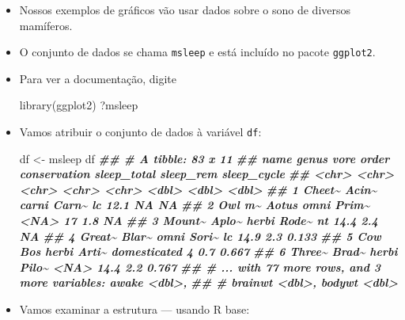 \documentclass[
  11pt]{report}
\newenvironment{Shaded}{\begin{snugshade}}{\end{snugshade}}
\newcommand{\DocumentationTok}[1]{\textcolor[rgb]{0.56,0.35,0.01}{\textbf{\textit{#1}}}}
\newcommand{\FunctionTok}[1]{\textcolor[rgb]{0.00,0.00,0.00}{#1}}
\newcommand{\NormalTok}[1]{#1}
\newcommand{\OtherTok}[1]{\textcolor[rgb]{0.56,0.35,0.01}{#1}}
\begin{document}
\begin{itemize}
\item
  Nossos exemplos de gráficos vão usar dados sobre o sono de diversos mamíferos.
\item
  O conjunto de dados se chama \texttt{msleep} e está incluído no pacote \texttt{ggplot2}.
\item
  Para ver a documentação, digite

\begin{Shaded}
\begin{Highlighting}[]
\FunctionTok{library}\NormalTok{(ggplot2)}
\NormalTok{?msleep}
\end{Highlighting}
\end{Shaded}
\item
  Vamos atribuir o conjunto de dados à variável \texttt{df}:

\begin{Shaded}
\begin{Highlighting}[]
\NormalTok{df }\OtherTok{\textless{}{-}}\NormalTok{ msleep}
\NormalTok{df}
\DocumentationTok{\#\# \# A tibble: 83 x 11}
\DocumentationTok{\#\#   name   genus vore  order conservation sleep\_total sleep\_rem sleep\_cycle}
\DocumentationTok{\#\#   \textless{}chr\textgreater{}  \textless{}chr\textgreater{} \textless{}chr\textgreater{} \textless{}chr\textgreater{} \textless{}chr\textgreater{}              \textless{}dbl\textgreater{}     \textless{}dbl\textgreater{}       \textless{}dbl\textgreater{}}
\DocumentationTok{\#\# 1 Cheet\textasciitilde{} Acin\textasciitilde{} carni Carn\textasciitilde{} lc                  12.1      NA        NA    }
\DocumentationTok{\#\# 2 Owl m\textasciitilde{} Aotus omni  Prim\textasciitilde{} \textless{}NA\textgreater{}                17         1.8      NA    }
\DocumentationTok{\#\# 3 Mount\textasciitilde{} Aplo\textasciitilde{} herbi Rode\textasciitilde{} nt                  14.4       2.4      NA    }
\DocumentationTok{\#\# 4 Great\textasciitilde{} Blar\textasciitilde{} omni  Sori\textasciitilde{} lc                  14.9       2.3       0.133}
\DocumentationTok{\#\# 5 Cow    Bos   herbi Arti\textasciitilde{} domesticated         4         0.7       0.667}
\DocumentationTok{\#\# 6 Three\textasciitilde{} Brad\textasciitilde{} herbi Pilo\textasciitilde{} \textless{}NA\textgreater{}                14.4       2.2       0.767}
\DocumentationTok{\#\# \# ... with 77 more rows, and 3 more variables: awake \textless{}dbl\textgreater{},}
\DocumentationTok{\#\# \#   brainwt \textless{}dbl\textgreater{}, bodywt \textless{}dbl\textgreater{}}
\end{Highlighting}
\end{Shaded}
\item
  Vamos examinar a estrutura --- usando R base:


\end{itemize}
\end{document}
